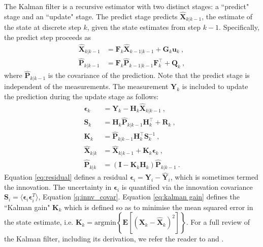 \documentclass[fleqn,usenatbib,useAMS]{mnras}
\begin{document}
The Kalman filter is a recursive estimator with two distinct stages: a ``predict" stage and an ``update" stage. The predict stage predicts $\hat{\boldsymbol{X}}_{k|k-1}$, the estimate of the state at discrete step $k$, given the state estimates from step $k-1$. Specifically, the predict step proceeds as
\begin{align}
	\hat{\boldsymbol{X}}_{k|k-1} &=  \boldsymbol{F}_k \hat{\boldsymbol{X}}_{k-1|k-1} + \boldsymbol{G}_k \boldsymbol{u}_k \ , \\
	\hat{\boldsymbol{P}}_{k|k-1} &=  \boldsymbol{F}_k \hat{\boldsymbol{P}}_{k-1|k-1} \boldsymbol{F}_k^\intercal + \boldsymbol{Q}_k  \ ,
\end{align}
where $\hat{\boldsymbol{P}}_{k|k-1}$ is the covariance of the prediction. Note that the predict stage is independent of the measurements. The measurement $\boldsymbol{Y}_k$ is included to update the prediction during the update stage as follows:
\begin{align}
	\boldsymbol{\epsilon}_{k} &= \boldsymbol{Y}_k - \boldsymbol{H}_k \hat{\boldsymbol{X}}_{k|k-1} \ , \label{eq:residual} \\
	\boldsymbol{S}_k &= \boldsymbol{H}_k \hat{\boldsymbol{P}}_{k|k-1} \boldsymbol{H}_k^\intercal + \boldsymbol{R}_k \ , \label{eq:innv_covar}\\
	\boldsymbol{K}_k &= \hat{\boldsymbol{P}}_{k|k-1} \boldsymbol{H}_k^\intercal \boldsymbol{S}_k^{-1} \ ,\label{eq:kalman gain} \\
	\hat{\boldsymbol{X}}_{k|k} &=\hat{\boldsymbol{X}}_{k|k-1} +\boldsymbol{K}_k  \boldsymbol{\epsilon}_{k}  \ , \label{eq:kalmangainupdate} \\
	\hat{\boldsymbol{P}}_{k|k} &= \left( \boldsymbol{I} - \boldsymbol{K}_k \boldsymbol{H}_k \right) 	\hat{\boldsymbol{P}}_{k|k-1} \ .
\end{align}
Equation \eqref{eq:residual} defines a residual $\boldsymbol{\epsilon}_i = \boldsymbol{Y}_i  - \hat{\boldsymbol{Y}}_i$, which is sometimes termed the innovation. The uncertainty in $\boldsymbol{\epsilon}_i$ is quantified via the innovation covariance $\boldsymbol{S}_i = \langle \boldsymbol{\epsilon}_i \boldsymbol{\epsilon}_i^{T} \rangle$, Equation \eqref{q:innv_covar}. Equation \eqref{eq:kalman gain} defines the ``Kalman gain" $\boldsymbol{K}_k$ which is defined so as to minimise the mean squared error in the state estimate, i.e.  $\boldsymbol{K}_k = \text{argmin} \left \{ \boldsymbol{E}[ (\boldsymbol{X}_k - \hat{\boldsymbol{X}}_k)^2 ] \right \}$. For a full review of the Kalman filter, including its derivation, we refer the reader to \cite{Gelb:1974} and \cite{zarchan2000fundamentals}. \newline 
\end{document}

